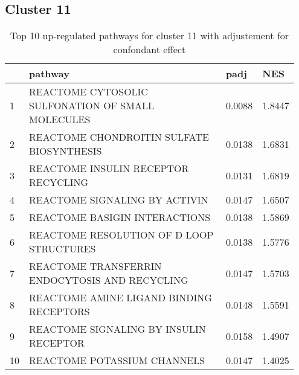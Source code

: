 \documentclass{article}
\begin{document}
\subsection{Cluster 11 }
\begin{table}[H]
\centering
\begin{tabular}{p{0.05\linewidth}p{0.7\linewidth}p{0.1\linewidth}p{0.1\linewidth}}
  \hline
 & pathway & padj & NES \\ 
  \hline
1 & REACTOME CYTOSOLIC SULFONATION OF SMALL MOLECULES & 0.0088 & 1.8447 \\ 
  2 & REACTOME CHONDROITIN SULFATE BIOSYNTHESIS & 0.0138 & 1.6831 \\ 
  3 & REACTOME INSULIN RECEPTOR RECYCLING & 0.0131 & 1.6819 \\ 
  4 & REACTOME SIGNALING BY ACTIVIN & 0.0147 & 1.6507 \\ 
  5 & REACTOME BASIGIN INTERACTIONS & 0.0138 & 1.5869 \\ 
  6 & REACTOME RESOLUTION OF D LOOP STRUCTURES & 0.0138 & 1.5776 \\ 
  7 & REACTOME TRANSFERRIN ENDOCYTOSIS AND RECYCLING & 0.0147 & 1.5703 \\ 
  8 & REACTOME AMINE LIGAND BINDING RECEPTORS & 0.0148 & 1.5591 \\ 
  9 & REACTOME SIGNALING BY INSULIN RECEPTOR & 0.0158 & 1.4907 \\ 
  10 & REACTOME POTASSIUM CHANNELS & 0.0147 & 1.4025 \\ 
   \hline
\end{tabular}
\caption{Top 10 up-regulated pathways for cluster 11 with adjustement for confondant effect} 
\label{tab:q3_2_conf_11}
\end{table}
\end{document}
